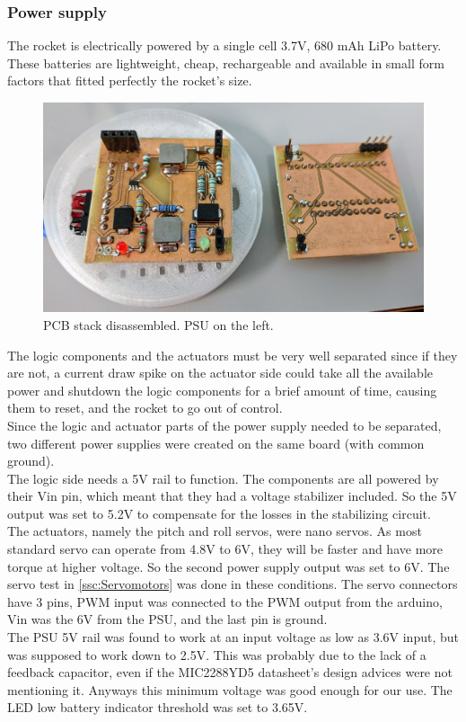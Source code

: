 \subsubsection{Power supply}
The rocket is electrically powered by a single cell 3.7V, 680 mAh LiPo battery. These batteries are lightweight, cheap, rechargeable and available in small form factors that fitted perfectly the rocket's size. \\

\begin{figure} [h]
	\centering
	\includegraphics[width=0.8\linewidth]{figures/Rocket/implementation/psu_board.jpg}
	\caption{PCB stack disassembled. PSU on the left.}
	\label{fig:PSU_board}
\end{figure}

The logic components and the actuators must be very well separated since if they are not, a current draw spike on the actuator side could take all the available power and shutdown the logic components for a brief amount of time, causing them to reset, and the rocket to go out of control. \\
Since the logic and actuator parts of the power supply needed to be separated, two different power supplies were created on the same board (with common ground). \\
The logic side needs a 5V rail to function. The components are all powered by their Vin pin, which meant that they had a voltage stabilizer included. So the 5V output was set to 5.2V to compensate for the losses in the stabilizing circuit. \\
The actuators, namely the pitch and roll servos, were nano servos. As most standard servo can operate from 4.8V to 6V, they will be faster and have more torque at higher voltage. So the second power supply output was set to 6V. The servo test in \autoref{ssc:Servomotors} was done in these conditions. The servo connectors have 3 pins, PWM input was connected to the PWM output from the arduino, Vin was the 6V from the PSU, and the last pin is ground. \\
The PSU 5V rail was found to work at an input voltage as low as 3.6V input, but was supposed to work down to 2.5V. This was probably due to the lack of a feedback capacitor, even if the MIC2288YD5 datasheet's design advices \cite{datasheet:MIC2288} were not mentioning it. Anyways this minimum voltage was good enough for our use. The LED low battery indicator threshold was set to 3.65V.

